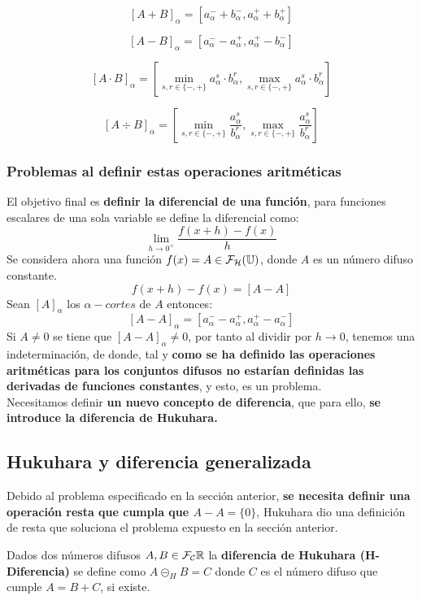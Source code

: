   $$
  [A+B]_\alpha = [a_\alpha^- + b_\alpha^-, a_\alpha^+ + b_\alpha^+]
  $$

  $$
  [A-B]_\alpha = [a_\alpha^- - a_\alpha^+, a_\alpha^+ - b_\alpha^-]
  $$

  $$
  [A \cdot B]_\alpha = \left[ \min_{s, r \in \{-, +\}} a_\alpha^s \cdot b_\alpha^r, \max_{s, r \in \{-, +\}} a_\alpha^s \cdot b_\alpha^r\right]
  $$

  $$
  [A \div B]_\alpha = \left[ \min_{s, r \in \{-, +\}} \frac{a_\alpha^s}{b_\alpha^r}, \max_{s, r \in \{-, +\}} \frac{a_\alpha^s}{b_\alpha^r}\right]
  $$

  \subsubsection{Problemas al definir estas operaciones aritméticas}
  El objetivo final es \textbf{definir la diferencial de una función}, para funciones escalares de una sola variable se define la diferencial como:
  $$
  \lim\limits_{h\rightarrow 0^+} \frac{f(x+h) - f(x)}{h}
  $$
  Se considera ahora una función $f(x)=A\in \mathcal{F}_\mathcal{H}(\mathbb U)$, donde $A$ es un número difuso constante. \\
  $$f(x+h) - f(x)=[A-A]$$
  Sean $[A]_\alpha$ los $\alpha-cortes$ de $A$ entonces:
  $$
  [A-A]_\alpha = [a_\alpha^- - a_\alpha^+, a_\alpha^+ - a_\alpha^-]
  $$
  Si $A\neq 0$ se tiene que $[A-A]_\alpha \neq 0$, por tanto al dividir por $h \rightarrow 0$, tenemos una indeterminación, de donde, tal y \textbf{como se ha definido las operaciones aritméticas para los conjuntos difusos no estarían definidas las derivadas de funciones constantes}, y esto, es un problema. \\
  Necesitamos definir \textbf{un nuevo concepto de diferencia}, que para ello, \textbf{se introduce la diferencia de Hukuhara.}

  \subsection{Hukuhara y diferencia generalizada} \label{def:hukukara}
  Debido al problema especificado en la sección anterior, \textbf{se necesita definir una operación resta que cumpla que $A-A=\{0\}$}, Hukuhara dio una definición de resta que soluciona el problema expuesto en la sección anterior.

  \begin{definicion}
    Dados dos números difusos $A, B \in \mathcal{F}_\mathcal{C}\mathbb R$ la \textbf{diferencia de Hukuhara (H-Diferencia)} se define como $A \circleddash_H B = C$ donde $C$ es el número difuso que cumple $A=B+C$, si existe.
  \end{definicion}

